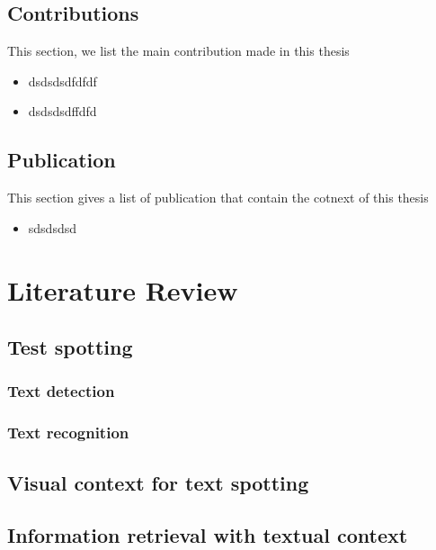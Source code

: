\documentclass[phd,tocprelim]{cornell}
\begin{document}
\section{Contributions}
This section, we list the main contribution made in this thesis
\begin{itemize}
    \item dsdsdsdfdfdf 
    \item dsdsdsdffdfd
\end{itemize}
\section{Publication}
This section gives a list of publication that contain the cotnext of this thesis
\begin{itemize}
    \item sdsdsdsd
\end{itemize}


\chapter{Literature Review}
\section{Test spotting}
\subsection{Text detection}
\subsection{Text recognition}
\section{Visual context for text spotting}
\section{Information retrieval with textual context}
\end{document}
